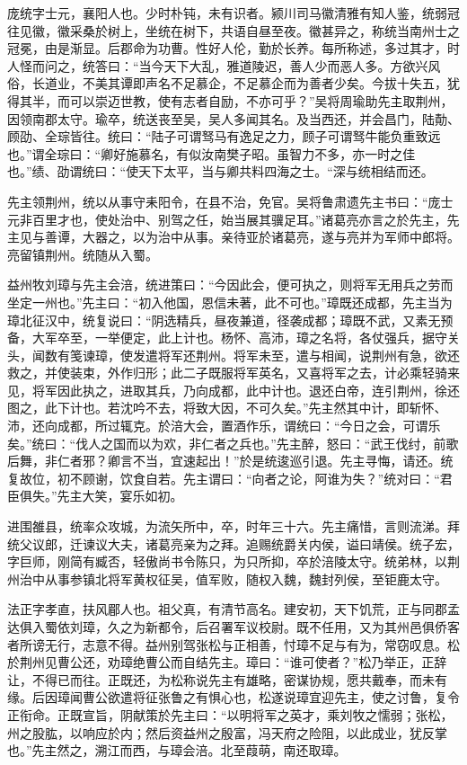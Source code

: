 \documentclass[12pt,UTF8]{ctexbook}
\begin{document}
庞统字士元，襄阳人也。少时朴钝，未有识者。颍川司马徽清雅有知人鉴，统弱冠往见徽，徽采桑於树上，坐统在树下，共语自昼至夜。徽甚异之，称统当南州士之冠冕，由是渐显。后郡命为功曹。性好人伦，勤於长养。每所称述，多过其才，时人怪而问之，统答曰：“当今天下大乱，雅道陵迟，善人少而恶人多。方欲兴风俗，长道业，不美其谭即声名不足慕企，不足慕企而为善者少矣。今拔十失五，犹得其半，而可以崇迈世教，使有志者自励，不亦可乎？”吴将周瑜助先主取荆州，因领南郡太守。瑜卒，统送丧至吴，吴人多闻其名。及当西还，并会昌门，陆勣、顾劭、全琮皆往。统曰：“陆子可谓驽马有逸足之力，顾子可谓驽牛能负重致远也。”谓全琮曰：“卿好施慕名，有似汝南樊子昭。虽智力不多，亦一时之佳也。”绩、劭谓统曰：“使天下太平，当与卿共料四海之士。“深与统相结而还。

先主领荆州，统以从事守耒阳令，在县不治，免官。吴将鲁肃遗先主书曰：“庞士元非百里才也，使处治中、别驾之任，始当展其骥足耳。”诸葛亮亦言之於先主，先主见与善谭，大器之，以为治中从事。亲待亚於诸葛亮，遂与亮并为军师中郎将。亮留镇荆州。统随从入蜀。

益州牧刘璋与先主会涪，统进策曰：“今因此会，便可执之，则将军无用兵之劳而坐定一州也。”先主曰：“初入他国，恩信未著，此不可也。”璋既还成都，先主当为璋北征汉中，统复说曰：“阴选精兵，昼夜兼道，径袭成都；璋既不武，又素无预备，大军卒至，一举便定，此上计也。杨怀、高沛，璋之名将，各仗强兵，据守关头，闻数有笺谏璋，使发遣将军还荆州。将军未至，遣与相闻，说荆州有急，欲还救之，并使装束，外作归形；此二子既服将军英名，又喜将军之去，计必乘轻骑来见，将军因此执之，进取其兵，乃向成都，此中计也。退还白帝，连引荆州，徐还图之，此下计也。若沈吟不去，将致大因，不可久矣。”先主然其中计，即斩怀、沛，还向成都，所过辄克。於涪大会，置酒作乐，谓统曰：“今日之会，可谓乐矣。”统曰：“伐人之国而以为欢，非仁者之兵也。”先主醉，怒曰：“武王伐纣，前歌后舞，非仁者邪？卿言不当，宜速起出！”於是统逡巡引退。先主寻悔，请还。统复故位，初不顾谢，饮食自若。先主谓曰：“向者之论，阿谁为失？”统对曰：“君臣俱失。”先主大笑，宴乐如初。

进围雒县，统率众攻城，为流矢所中，卒，时年三十六。先主痛惜，言则流涕。拜统父议郎，迁谏议大夫，诸葛亮亲为之拜。追赐统爵关内侯，谥曰靖侯。统子宏，字巨师，刚简有臧否，轻傲尚书令陈只，为只所抑，卒於涪陵太守。统弟林，以荆州治中从事参镇北将军黄权征吴，值军败，随权入魏，魏封列侯，至钜鹿太守。

法正字孝直，扶风郿人也。祖父真，有清节高名。建安初，天下饥荒，正与同郡孟达俱入蜀依刘璋，久之为新都令，后召署军议校尉。既不任用，又为其州邑俱侨客者所谤无行，志意不得。益州别驾张松与正相善，忖璋不足与有为，常窃叹息。松於荆州见曹公还，劝璋绝曹公而自结先主。璋曰：“谁可使者？”松乃举正，正辞让，不得已而往。正既还，为松称说先主有雄略，密谋协规，愿共戴奉，而未有缘。后因璋闻曹公欲遣将征张鲁之有惧心也，松遂说璋宜迎先主，使之讨鲁，复令正衔命。正既宣旨，阴献策於先主曰：“以明将军之英才，乘刘牧之懦弱；张松，州之股肱，以响应於内；然后资益州之殷富，冯天府之险阻，以此成业，犹反掌也。”先主然之，溯江而西，与璋会涪。北至葭萌，南还取璋。
\end{document}
